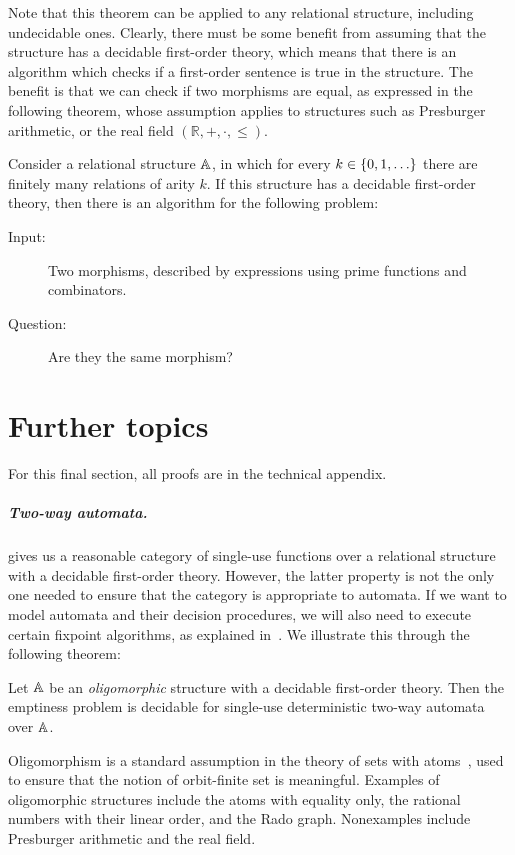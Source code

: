 \documentclass[a4paper,UKenglish,cleveref, autoref, numberwithinsect, thm-restate]{lipics-v2021}
\begin{document}
Note that this  theorem can be applied to any relational structure, including undecidable ones. Clearly, there must be some benefit from assuming that the structure has a decidable first-order theory, which means that there is an algorithm which checks if a first-order sentence is true in the structure. 
The benefit is that we can check if two morphisms are equal, as expressed in the following theorem, whose assumption applies to structures such as Presburger arithmetic, or the real field $(\mathbb R, +, \cdot, \leq)$.

\begin{theorem}\label{thm:first-order-decidable}
    Consider a relational structure $\mathbb A$, in which for every $k \in \{0,1,\ldots\}$ there are finitely many relations of arity $k$. If this structure has a decidable first-order theory, then there is an algorithm for the following problem:
    \begin{description}
        \item[Input:] Two morphisms, described by expressions using prime functions and combinators.
        \item[Question:] Are they the same morphism?
    \end{description}
\end{theorem}



\section{Further topics}
\label{sec:further-topics}

For this final section, all proofs are in the technical appendix.

\subparagraph{Two-way automata.}

 gives us a reasonable category of single-use functions over a relational structure with a decidable first-order theory. 
However, the latter property is not the only one needed to ensure that the category is appropriate to automata. If we want to model automata and their decision procedures, we will also need to execute certain fixpoint algorithms, as explained in~\cite{bojanczyk_slightly2018}. We illustrate this through the following theorem:
\begin{theorem}\label{thm:two-way-automata}
    Let $\mathbb A$ be an \emph{oligomorphic} structure with a decidable first-order theory. Then the emptiness problem is decidable for single-use deterministic two-way automata over $\mathbb A$.
\end{theorem}
Oligomorphism is a standard assumption in the theory of sets with atoms~\cite{bojanczyk_slightly2018}, used to ensure that the notion of orbit-finite set is meaningful. Examples of oligomorphic structures include the atoms with equality only, the rational numbers with their linear order, and the Rado graph. Nonexamples include Presburger arithmetic and the real field. 
\end{document}
